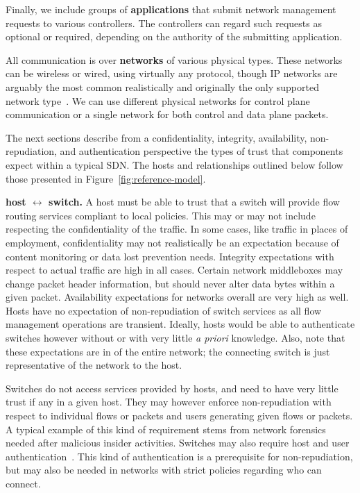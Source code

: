 \documentclass[10pt,conference]{IEEEtran}
\begin{document}
Finally, we include groups of {\bf applications} that submit network management requests to various controllers.  The controllers can regard such requests as optional or required, depending on the authority of the submitting application.

All communication is over {\bf networks} of various physical types.  These networks can be wireless or wired, using virtually any protocol, though IP networks are arguably the most common realistically and originally the only supported network type~\cite{openflow1.0}.  We can use different physical networks for control plane communication or a single network for both control and data plane packets.

The next sections describe from a confidentiality, integrity, availability, non-repudiation, and authentication perspective the types of trust that components expect within a typical SDN.  The hosts and relationships outlined below follow those presented in Figure~\ref{fig:reference-model}.

\noindent
{\bf host $\leftrightarrow$ switch.} A host must be able to trust that a switch will provide flow routing services compliant to local policies.  This may or may not include respecting the confidentiality of the traffic. In some cases, like traffic in places of employment, confidentiality may not realistically be an expectation because of content monitoring or data lost prevention needs.  Integrity expectations with respect to actual traffic are high in all cases.  Certain network middleboxes may change packet header information, but should never alter data bytes within a given packet.  Availability expectations for networks overall are very high as well.  Hosts have no expectation of non-repudiation of switch services as all flow management operations are transient.  Ideally, hosts would be able to authenticate switches however without or with very little {\sl a priori} knowledge.  Also, note that these expectations are in of the entire network; the connecting switch is just representative of the network to the host.

Switches do not access services provided by hosts, and need to have very little trust if any in a given host.  They may however enforce non-repudiation with respect to individual flows or packets and users generating given flows or packets.  A typical example of this kind of requirement stems from network forensics needed after malicious insider activities. Switches may also require host and user authentication~\cite{CaFrPeLu:07}.  This kind of authentication is a prerequisite for non-repudiation, but may also be needed in networks with strict policies regarding who can connect.
\end{document}
